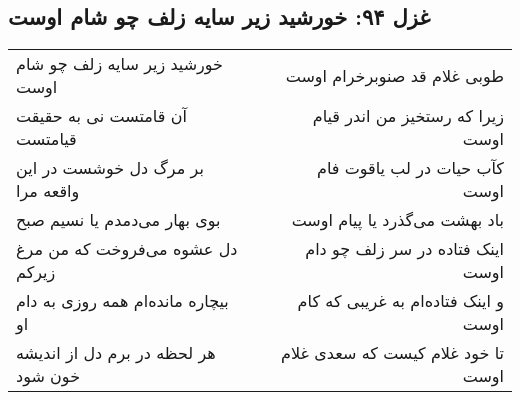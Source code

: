 \begin{center}
\section*{غزل ۹۴: خورشید زیر سایه زلف چو شام اوست}
\label{sec:094}
\begin{longtable}{l p{0.5cm} r}
خورشید زیر سایه زلف چو شام اوست
&&
طوبی غلام قد صنوبرخرام اوست
\\
آن قامتست نی به حقیقت قیامتست
&&
زیرا که رستخیز من اندر قیام اوست
\\
بر مرگ دل خوشست در این واقعه مرا
&&
کآب حیات در لب یاقوت فام اوست
\\
بوی بهار می‌دمدم یا نسیم صبح
&&
باد بهشت می‌گذرد یا پیام اوست
\\
دل عشوه می‌فروخت که من مرغ زیرکم
&&
اینک فتاده در سر زلف چو دام اوست
\\
بیچاره مانده‌ام همه روزی به دام او
&&
و اینک فتاده‌ام به غریبی که کام اوست
\\
هر لحظه در برم دل از اندیشه خون شود
&&
تا خود غلام کیست که سعدی غلام اوست
\\
\end{longtable}
\end{center}
